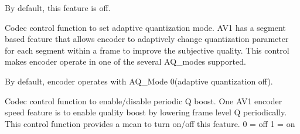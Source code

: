 \begin{Desc}
\begin{description}
By default, this feature is off. \item[{\em 
A\+V1\+E\+\_\+\+S\+E\+T\+\_\+\+A\+Q\+\_\+\+M\+O\+DE\hypertarget{group__aom__encoder_ggae78dde67a6d78f332e9bdba0dde42db5a17bd297efc31082157785d68fc5a6067}{}\label{group__aom__encoder_ggae78dde67a6d78f332e9bdba0dde42db5a17bd297efc31082157785d68fc5a6067}
}]Codec control function to set adaptive quantization mode. A\+V1 has a segment based feature that allows encoder to adaptively change quantization parameter for each segment within a frame to improve the subjective quality. This control makes encoder operate in one of the several A\+Q\+\_\+modes supported.

By default, encoder operates with A\+Q\+\_\+\+Mode 0(adaptive quantization off). \item[{\em 
A\+V1\+E\+\_\+\+S\+E\+T\+\_\+\+F\+R\+A\+M\+E\+\_\+\+P\+E\+R\+I\+O\+D\+I\+C\+\_\+\+B\+O\+O\+ST\hypertarget{group__aom__encoder_ggae78dde67a6d78f332e9bdba0dde42db5a737368591a37417b108c0706f7510885}{}\label{group__aom__encoder_ggae78dde67a6d78f332e9bdba0dde42db5a737368591a37417b108c0706f7510885}
}]Codec control function to enable/disable periodic Q boost. One A\+V1 encoder speed feature is to enable quality boost by lowering frame level Q periodically. This control function provides a mean to turn on/off this feature. 0 = off 1 = on


\end{description}
\end{Desc}
